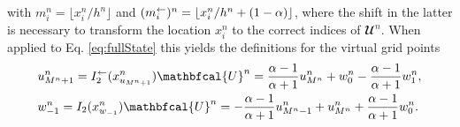 with $m_i^n = \lfloor x_i^n/h^n\rfloor$ and $(m_i^\leftarrow)^n = \lfloor x_i^n/ h^n+(1-\alpha) \rfloor$, where the shift in the latter is necessary to transform the location $x_i^n$ to the correct indices of $\mathbfcal{U}^n$.
When applied to Eq. \eqref{eq:fullState} this yields the definitions for the virtual grid points
\begin{subequations}\label{eq:connectionInterpol}
\begin{align}
        &u_{M^n+1}^n = I_2^\flip(x^n_{u_{M^n+1}})\mathbfcal{U}^n = \frac{\alpha - 1}{\alpha + 1}u_{M^n}^n + w_0^n - \frac{\alpha - 1}{\alpha + 1}w_1^n,
    \label{eq:calcUMP1}\\
        &w_{-1}^n = I_2(x^n_{w_{-1}})\mathbfcal{U}^n
        =-\frac{\alpha - 1}{\alpha + 1}u_{M^n-1}^n + u_{M^n}^n+ \frac{\alpha - 1}{\alpha + 1}w_{0}^n.\label{eq:calcWM1}
\end{align}
\end{subequations}
